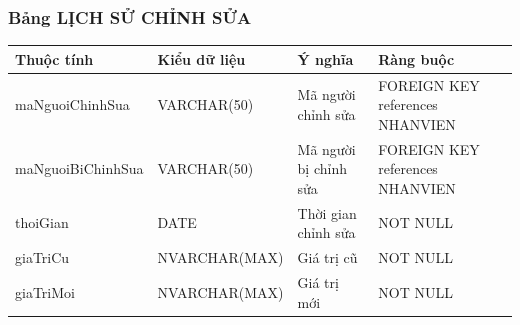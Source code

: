 \documentclass[a4paper,12pt]{report}
\begin{document}
\subsubsection{Bảng LỊCH SỬ CHỈNH SỬA}
\noindent
\begin{center}
    \begin{longtable}{|>{\centering\arraybackslash}p{4.5cm}|
        >{\centering\arraybackslash}p{4.2cm}|
        >{\centering\arraybackslash}p{2.5cm}|
        >{\centering\arraybackslash}p{3.8cm}|}
        \hline
        \textbf{Thuộc tính}                                                                                                               &
        \textbf{Kiểu dữ liệu}                                                                                                                             &
        \textbf{Ý nghĩa}                                                                                                 &
        \textbf{Ràng buộc}                                                                                                         \\
        \hline
        maNguoiChinhSua &  VARCHAR(50)  & Mã người chỉnh sửa & FOREIGN KEY references NHANVIEN \\
        \hline
        maNguoiBiChinhSua &  VARCHAR(50)  & Mã người bị chỉnh sửa & FOREIGN KEY references NHANVIEN \\                                                                                                                          
        \hline
        thoiGian &  DATE  & Thời gian chỉnh sửa & NOT NULL \\                                                                                                                          
        \hline
        giaTriCu &  NVARCHAR(MAX)  & Giá trị cũ & NOT NULL\\                                                                                                                          
        \hline
        giaTriMoi & NVARCHAR(MAX)  & Giá trị mới & NOT NULL \\                                                                                                                          
        \hline
    \end{longtable}
\end{center}
\newpage
\end{document}
